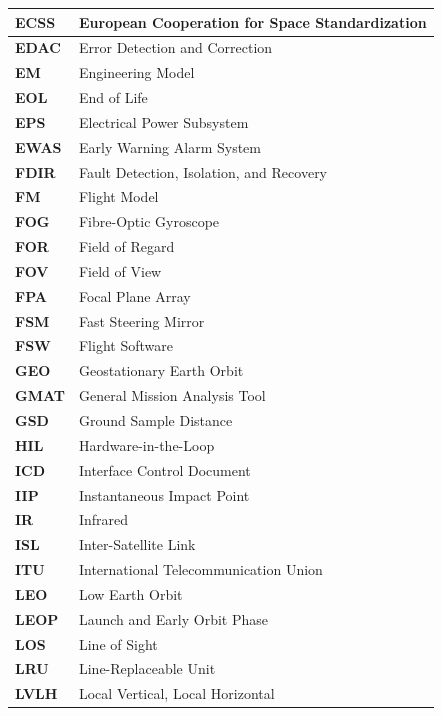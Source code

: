 {\begin{longtable}{|>{\raggedright\arraybackslash}p{3.0cm}|>{\raggedright\arraybackslash}p{12.4cm}|}
    \textbf{ECSS}   & European Cooperation for Space Standardization \\ \hline
    \textbf{EDAC}   & Error Detection and Correction \\ \hline
    \textbf{EM}     & Engineering Model \\ \hline
    \textbf{EOL}    & End of Life \\ \hline
    \textbf{EPS}    & Electrical Power Subsystem \\ \hline
    \textbf{EWAS}   & Early Warning Alarm System \\ \hline
    \textbf{FDIR}   & Fault Detection, Isolation, and Recovery \\ \hline
    \textbf{FM}     & Flight Model \\ \hline
    \textbf{FOG}    & Fibre-Optic Gyroscope \\ \hline
    \textbf{FOR}    & Field of Regard \\ \hline
    \textbf{FOV}    & Field of View \\ \hline
    \textbf{FPA}    & Focal Plane Array \\ \hline
    \textbf{FSM}    & Fast Steering Mirror \\ \hline
    \textbf{FSW}    & Flight Software \\ \hline
    \textbf{GEO}    & Geostationary Earth Orbit \\ \hline
    \textbf{GMAT}   & General Mission Analysis Tool \\ \hline
    \textbf{GSD}    & Ground Sample Distance \\ \hline
    \textbf{HIL}    & Hardware-in-the-Loop \\ \hline
    \textbf{ICD}    & Interface Control Document \\ \hline
    \textbf{IIP}    & Instantaneous Impact Point \\ \hline
    \textbf{IR}     & Infrared \\ \hline
    \textbf{ISL}    & Inter-Satellite Link \\ \hline
    \textbf{ITU}    & International Telecommunication Union \\ \hline
    \textbf{LEO}    & Low Earth Orbit \\ \hline
    \textbf{LEOP}   & Launch and Early Orbit Phase \\ \hline
    \textbf{LOS}    & Line of Sight \\ \hline
    \textbf{LRU}    & Line-Replaceable Unit \\ \hline
    \textbf{LVLH}   & Local Vertical, Local Horizontal \\ \hline

\end{longtable}}
